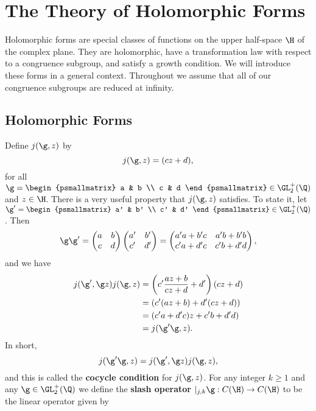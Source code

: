 \chapter{The Theory of Holomorphic Forms}
  Holomorphic forms are special classes of functions on the upper half-space $\H$ of the complex plane. They are holomorphic, have a transformation law with respect to a congruence subgroup, and satisfy a growth condition. We will introduce these forms in a general context. Throughout we assume that all of our congruence subgroups are reduced at infinity.
  \section{Holomorphic Forms}
    Define $j(\g,z)$ by
    \[
      j(\g,z) = (cz+d),
    \]
    for all $\g = \begin{psmallmatrix} a & b \\ c & d \end{psmallmatrix} \in \GL_{2}^{+}(\Q)$ and $z \in \H$. There is a very useful property that $j(\g,z)$ satisfies. To state it, let $\g' = \begin{psmallmatrix} a' & b' \\ c' & d' \end{psmallmatrix} \in \GL_{2}^{+}(\Q)$. Then
    \[
      \g\g' = \begin{pmatrix} a & b \\ c & d \end{pmatrix}\begin{pmatrix} a' & b' \\ c' & d' \end{pmatrix} = \begin{pmatrix} a'a+b'c & a'b+b'b \\ c'a+d'c & c'b+d'd \end{pmatrix},
    \]
    and we have
    \begin{align*}
      j(\g',\g z)j(\g,z) &= \left(c'\frac{az+b}{cz+d}+d'\right)(cz+d) \\
      &= (c'(az+b)+d'(cz+d)) \\
      &= (c'a+d'c)z+c'b+d'd) \\
      &= j(\g'\g,z).
    \end{align*}
    In short,
    \[
      j(\g'\g,z) =  j(\g',\g z)j(\g,z),
    \]
    and this is called the \textbf{cocycle condition} for $j(\g,z)$. For any integer $k \ge 1$ and any $\g \in \GL_{2}^{+}(\Q)$ we define the \textbf{slash operator} $|_{j,k}\g:C(\H) \to C(\H)$ to be the linear operator given by

